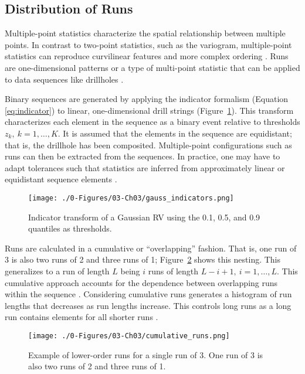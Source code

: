 \FloatBarrier
\subsection{Distribution of Runs}
\label{subsec:03runs}

Multiple-point statistics characterize the spatial relationship between multiple points. In contrast to two-point statistics, such as the variogram, multiple-point statistics can reproduce curvilinear features and more complex ordering \citep{guardiano1993multivariate}. Runs are one-dimensional patterns or a type of multi-point statistic that can be applied to data sequences like drillholes \citep{boisvert2007multiplepoint}.

Binary sequences are generated by applying the indicator formalism (Equation \ref{eq:indicator}) to linear, one-dimensional drill strings (Figure~\ref{fig:gauss_indicators}). This transform characterizes each element in the sequence as a binary event relative to thresholds $z_{k}, \ k=1,\dots,K$. It is assumed that the elements in the sequence are equidistant; that is, the drillhole has been composited. Multiple-point configurations such as runs can then be extracted from the sequences. In practice, one may have to adapt tolerances such that statistics are inferred from approximately linear or equidistant sequence elements \citep{ortiz2003characterization}.

\begin{figure}[htb!]
    \centering
    \texttt{[image: ./0-Figures/03-Ch03/gauss\_indicators.png]}
    \caption{Indicator transform of a Gaussian \gls{RV} using the 0.1, 0.5, and 0.9 quantiles as thresholds. }
    \label{fig:gauss_indicators}
\end{figure}

Runs are calculated in a cumulative or ``overlapping'' fashion. That is, one run of 3 is also two runs of 2 and three runs of 1; Figure~\ref{fig:cumulative_runs} shows this nesting. This generalizes to a run of length $L$ being $i$ runs of length $L-i+1, \ i=1,\dots,L$. This cumulative approach accounts for the dependence between overlapping runs within the sequence \citep{fu2003distribution}. Considering cumulative runs generates a histogram of run lengths that decreases as run lengths increase. This controls long runs as a long run contains elements for all shorter runs \citep{ortiz2003characterization}.

\begin{figure}[htb!]
    \centering
    \texttt{[image: ./0-Figures/03-Ch03/cumulative\_runs.png]}
    \caption{Example of lower-order runs for a single run of 3. One run of 3 is also two runs of 2 and three runs of 1.}
    \label{fig:cumulative_runs}
\end{figure}

